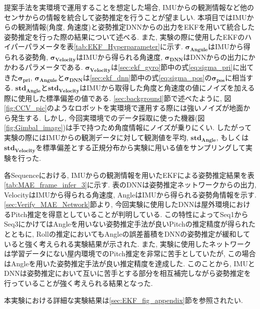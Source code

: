 提案手法を実環境で運用することを想定した場合, IMUからの観測情報など他のセンサからの情報を統合して姿勢推定を行うことが望ましい. 本項目ではIMUからの観測情報(角度, 角速度)と姿勢推定DNNからの出力をEKFを用いて統合した姿勢推定を行った際の結果について述べる. また, 実験の際に使用したEKFのハイパーパラメータを表\ref{tab:EKF_Hyperparameter}に示す. $\bm{\sigma_{Angule}}$はIMUから得られる姿勢角, $\bm{\sigma_{Velocity}}$はIMUから得られる角速度, $\bm{\sigma_{DNN}}$はDNNからの出力にかかわるパラメータである. $\bm{\sigma_{Velocity}}$は\ref{sec:ekf_gyro}節中の式\ref{eq:sigma_pri}に出てきた$\bm{\sigma_{pri}}$, $\bm{\sigma_{Angule}}$と$\bm{\sigma_{DNN}}$は\ref{sec:ekf_dnn}節中の式\ref{eq:sigma_pos}の$\bm{\sigma_{pos}}$に相当する. $\bm{std_{Angle}}$と$\bm{std_{Velocity}}$はIMUから取得した角度と角速度の値にノイズを加える際に使用した標準偏差の値である. \ref{sec:background}節で述べたように, 図\ref{fig:CCV_pic}のようなロボットを実環境で運用する際には強いノイズが地面から発生する. しかし, 今回実環境でのデータ採取に使った機器(図\ref{fig:Gimbal_image})は手で持つため角度情報にノイズが乗りにくい. したがって実験の際にはIMUからの観測データに対して観測値を平均, $\bm{std_{Angle}}$, もしくは$\bm{std_{Velocity}}$を標準偏差とする正規分布から実験に用いる値をサンプリングして実験を行った.\par
各Sequenceにおける, IMUからの観測情報を用いたEKFによる姿勢推定結果を表\ref{tab:MAE_frame_infer_3}に示す. 表のDNNは姿勢推定ネットワークからの出力, VelocityはIMUから得られる角速度, AngleはIMUから得られる姿勢角情報を示す. \ref{sec:Verify_MAE_Network}節より, 今回実験に使用したDNNは屋外環境におけるPitch推定を得意としていることが判明している. この特性によってSeq1からSeq3にかけてはAngleを用いない姿勢推定手法が良いPitchの推定精度が得られたとともに, Rollの推定においてもAngleの誤差蓄積をDNNの姿勢推定が緩和していると強く考えられる実験結果が示された. また, 実験に使用したネットワークは学習データにない屋内環境でのPitch推定を非常に苦手としていたが, この場合はAngleを用いた姿勢推定手法が良い推定精度を達成した. このことから, IMUとDNNは姿勢推定において互いに苦手とする部分を相互補完しながら姿勢推定を行っていることが強く考えられる結果となった. \par
本実験における詳細な実験結果は\ref{sec:EKF_fig_appendix}節を参照されたい.

